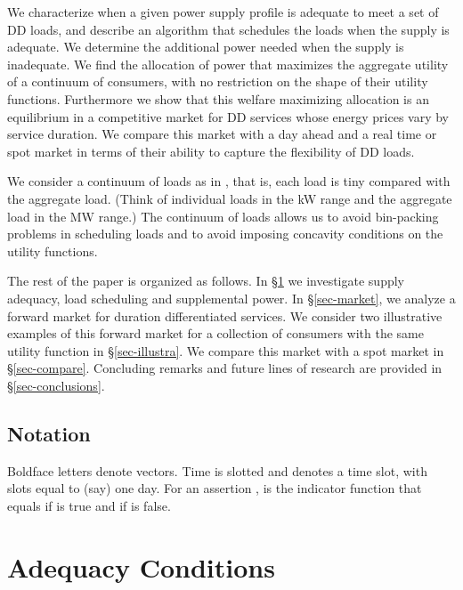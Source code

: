 \documentclass[10pt,draftcls,onecolumn]{IEEEtran}
\newcounter{l1}
\newcounter{l2}
\newcounter{l3}
\begin{document}
We  characterize when a given power supply profile  is adequate to meet a set of DD loads, and describe an algorithm that schedules the loads when the supply is adequate. We  determine the additional power needed when the supply is inadequate.  We find the  allocation of power that maximizes the aggregate utility of a continuum of consumers, with no restriction on the shape of their utility functions.  Furthermore we show that this welfare maximizing allocation is an equilibrium in a competitive market for DD services whose  energy prices  vary by  service duration.  We compare this market with a day ahead and a real time or spot market in terms of their ability to capture the flexibility of DD loads.

We consider  a continuum of loads as in  \cite{tanvar93}, that is, each load is tiny compared with the aggregate load.  (Think of individual loads in the kW range and the aggregate load in the MW range.)  The  continuum of loads allows us to avoid bin-packing problems in scheduling loads and to avoid imposing  concavity conditions on the utility functions.

The rest of the paper is organized as follows. In \S \ref{sec-adequacy} we investigate supply adequacy, load scheduling and supplemental power. In \S \ref{sec-market},  we analyze a forward market for duration differentiated services. We consider two illustrative examples of this forward market for a collection of consumers with the same  utility function in \S \ref{sec-illustra}.  We compare this market with a spot market in \S \ref{sec-compare}.  Concluding remarks and future lines of research are provided in \S \ref{sec-conclusions}.

\subsection*{Notation}

Boldface letters denote vectors.  Time is slotted and  denotes a time slot, with  slots equal to (say) one day.   For an assertion ,  is the indicator function that equals  if  is true and  if  is false. 

















\section{Adequacy Conditions}\label{sec-adequacy}
\end{document}
